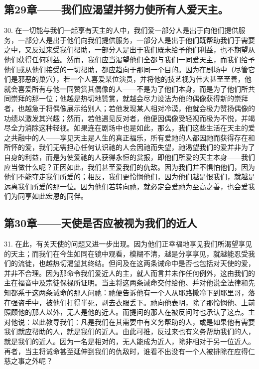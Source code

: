 
\subsection{第29章——我们应渴望并努力使所有人爱天主。}

30. 在一切能与我们一起享有天主的人中，我们爱一部分人是出于向他们提供服务，一部分人是出于他们向我们提供服务，一部分人是出于他们既帮助我们于需要之中，又反过来受我们帮助，一部分人是出于我们既未给予他们利益，也不期望从他们获得任何利益。然而，我们应当渴望他们全都与我们一同爱天主，而我们给予他们或从他们接受的一切帮助，都应趋向于那同一个目的。因为在剧场中（尽管它们是邪恶的巢穴），若一个人喜爱某位演员，并将他的技艺视为伟大甚至至善，他就会喜爱所有与他一同赞赏其偶像的人——不是为了他们本身，而是为了他们所共同崇拜的那一位；他越是热切地赞赏，就越会尽力设法为他的偶像获得新的崇拜者，也越急于将偶像展示给别人；若他发现某人相对冷漠，他就会极力赞扬偶像的功绩以激发其兴趣；然而，若他遇见反对者，他便因偶像受轻视而极为不悦，并竭尽全力消除这种轻视。如果连在剧场中也是如此，那么，我们这些生活在天主的爱之共融中的人——享见天主是人生的真正福乐，所有爱祂的人都因祂而获得存在和所怀的爱，我们无需担心任何认识祂的人会因祂而失望，祂渴望我们的爱并非为了自身的利益，而是为使爱祂的人获得永恒的赏报，即他们所爱的天主本身——我们应当做什么呢？正因如此，我们甚至爱我们的仇敌。因为我们并不惧怕他们，因为他们不能夺走我们所爱的；相反，我们更怜悯他们，因为他们越是恨我们，就越是远离我们所爱的那一位。因为他们若转向祂，就必定会爱祂为至高之善，也会爱我们为同享如此宏恩的同伴。\par


\subsection{第30章——天使是否应被视为我们的近人}

31. 在此，有关天使的问题又进一步出现。因为他们正幸福地享见我们所渴望享见的天主；而我们在今生如同在镜中观看，模糊不清，越是分享享见，就越能忍受我们的流徙，也越热切渴望其终结。但问及在这两条诫命中是否也包括对天使的爱，并非不合理。因为那命令我们爱近人的主，就人而言并未作任何例外，这由我们的主在福音中及宗徒保禄所证明。当主将这两条诫命交付给他、并对他说全法律和先知都系于这两条诫命的那人问祂：祂便告诉他有一个人从耶路撒冷下到耶里哥，落在强盗手中，被他们打得半死，剥去衣服丢下。祂向他表明，除了那怜悯他、上前照顾他的那人以外，无人是他的近人。而提问的那人在被反问时也承认了这点。主对他说：以此教导我们：凡是我们在其需要中有义务帮助的人，或是如果他有需要我们就应帮助的人，就是我们的近人。由此可推，反过来也有义务帮助我们的人，就是我们的近人。因为一名是相对的，无人能成为近人，除非相对于另一位近人。再者，当主将诫命甚至延伸到我们的仇敌时，谁看不出没有一个人被排除在应得仁慈之事之外呢？\par

